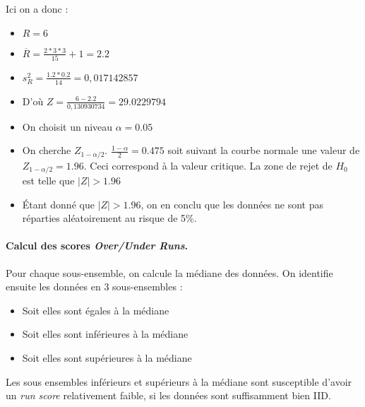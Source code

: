 Ici on a donc : 
\begin{itemize}
\item $R = 6$
\item $\overline{R}= \frac{2*3*3}{15}+1 = 2.2 $
\item $s_R^2 = \frac{1.2*0.2}{14} = 0,017142857$
\item D'où $ Z = \frac{6 -2.2}{0,130930734} = 29.0229794$
\item On choisit un niveau $\alpha=0.05$
\item On cherche $Z_{1-\alpha/2}$. $\frac{1-\alpha}{2}=0.475$ soit suivant la courbe normale une valeur de  $Z_{1-\alpha/2}=1.96$. Ceci correspond à la valeur critique. La zone de rejet de $H_0$ est telle que $|Z| > 1.96$
\item Étant donné que $|Z| > 1.96$, on en conclu que les données ne sont pas réparties aléatoirement au risque de 5\%.\\

\end{itemize}


\paragraph{Calcul des scores \textit{Over/Under Runs}.\\}
Pour chaque sous-ensemble, on calcule la médiane des données. On identifie ensuite les données en 3 sous-ensembles :
\begin{itemize}
\item Soit elles sont égales à la médiane
\item Soit elles sont inférieures à la médiane
\item Soit elles sont supérieures à la médiane
\end{itemize}
Les sous ensembles inférieurs et supérieurs à la médiane sont susceptible d'avoir un \textit{run score} relativement faible, si les données sont suffisamment bien IID.\\

